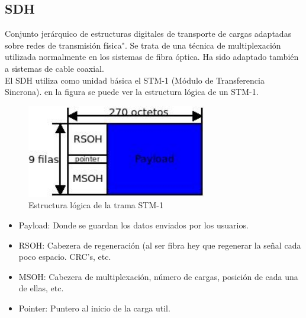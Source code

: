 \subsection{SDH}
Conjunto jerárquico de estructuras digitales de transporte de cargas adaptadas sobre redes de transmisión física". Se trata de una técnica de multiplexación utilizada normalmente en los sistemas de fibra óptica. Ha sido adaptado también a sistemas de cable coaxial.\\
El SDH utiliza como unidad básica el STM-1 (Módulo de Transferencia Sincrona). en la figura se puede ver la estructura lógica de un STM-1.
\begin{figure}[H]
\centering
\includegraphics[width=0.7\textwidth]{Imagen/diaSTM1.jpg}
\caption{Estructura lógica de la trama STM-1}
\label{}
\end{figure}
\begin{itemize}
	\item Payload: Donde se guardan los datos enviados por los usuarios.
	\item RSOH: Cabezera de regeneración (al ser fibra hey que regenerar la señal cada poco espacio. CRC's, etc.
	\item MSOH: Cabezera de multiplexación, número de cargas, posición de cada una de ellas, etc.
	\item Pointer: Puntero al inicio de la carga util.
\end{itemize}
